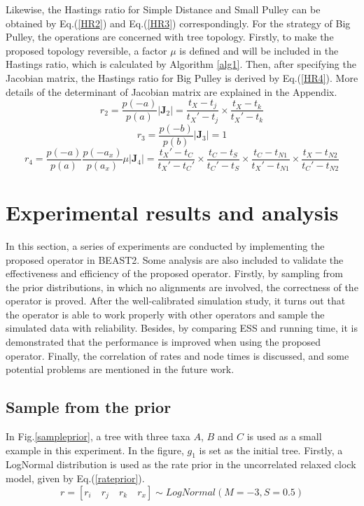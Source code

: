 \documentclass{bmcart}
\begin{document}
Likewise, the Hastings ratio for Simple Distance and Small Pulley can be obtained by Eq.(\ref{HR2}) and Eq.(\ref{HR3}) correspondingly. For the strategy of Big Pulley, the operations are concerned with tree topology. Firstly, to make the proposed topology reversible, a factor $\mu$ is defined and will be included in the Hastings ratio, which is calculated by Algorithm \ref{alg1}. Then, after specifying the Jacobian matrix, the Hastings ratio for Big Pulley is derived by Eq.(\ref{HR4}). More details of the determinant of Jacobian matrix are explained in the Appendix. 
\begin{equation}\label{HR2}
{r_2} = \frac{{p( - a)}}{{p(a)}}\left| {{{\mathbf{J}}_2}} \right| = \frac{{{t_X} - {t_j}}}{{{t_X}' - {t_j}}} \times \frac{{{t_X} - {t_k}}}{{{t_X}' - {t_k}}}
\end{equation}
\begin{equation}\label{HR3}
{r_3} = \frac{{p( - b)}}{{p(b)}}\left| {{{\mathbf{J}}_3}} \right| = 1
\end{equation}
\begin{equation}\label{HR4}
{r_4} = \frac{{p( - a)}}{{p(a)}}\frac{{p( - {a_x} )}}{{p({a_x} )}}\mu \left| {{{\mathbf{J}}_4}} \right| = \frac{{{t_X}' - {t_C}}}{{{t_X}' - {t_C}'}} \times \frac{{{t_C} - {t_S}}}{{{t_C}' - {t_S}}} \times \frac{{{t_C} - {t_{N1}}}}{{{t_X}' - {t_{N1}}}} \times \frac{{{t_X} - {t_{N2}}}}{{{t_C}' - {t_{N2}}}}
\end{equation}
\section*{Experimental results and analysis}
In this section, a series of experiments are conducted by implementing the proposed operator in BEAST2. Some analysis are also included to validate the effectiveness and efficiency of the proposed operator. Firstly, by sampling from the prior distributions, in which no alignments are involved, the correctness of the operator is proved. After the well-calibrated simulation study, it turns out that the operator is able to work properly with other operators and sample the simulated data with reliability. Besides, by comparing ESS and running time, it is demonstrated that the performance is improved when using the proposed operator. Finally, the correlation of rates and node times is discussed, and some potential problems are mentioned in the future work. 
\subsection*{Sample from the prior}
In Fig.\ref{sampleprior}, a tree with three taxa $A$, $B$ and $C$ is used as a small example in this experiment. In the figure, $g_1$ is set as the initial tree. Firstly, a LogNormal distribution is used as the rate prior in the uncorrelated relaxed clock model, given by Eq.(\ref{rateprior}).
\begin{equation}\label{rateprior}
r = [{r_i}\quad{r_j}\quad{r_k}\quad{r_x}] \sim LogNormal(M = -3, S = 0.5)
\end{equation}
\end{document}
